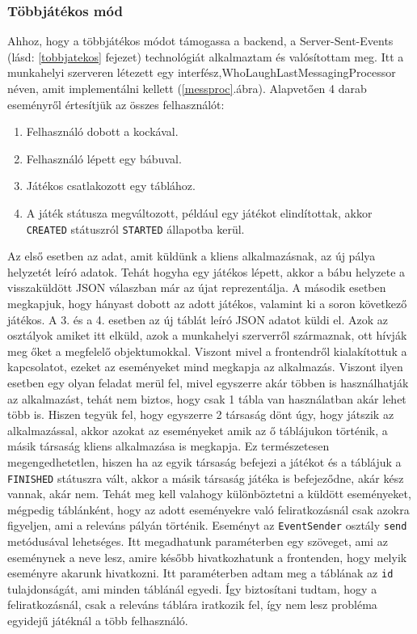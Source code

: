 \documentclass[a4paper,twoside]{article}
\begin{document}
\subsubsection{Többjátékos mód} \label{tobbjatekos-backend}
Ahhoz, hogy a többjátékos módot támogassa a backend, a Server-Sent-Events (lásd: \ref{tobbjatekos} fejezet) technológiát alkalmaztam és valósítottam meg. Itt a munkahelyi szerveren létezett  egy interfész,WhoLaughLastMessagingProcessor néven, amit implementálni kellett (\ref{messproc}.ábra). Alapvetően 4 darab eseményről értesítjük az összes felhasználót: \begin{enumerate}
	\item Felhasználó dobott a kockával.
	\item Felhasználó lépett egy bábuval.
	\item Játékos csatlakozott egy táblához.
	\item A játék státusza megváltozott, például egy játékot elindítottak, akkor \texttt{CRE\-ATED} státuszról \verb|STARTED| állapotba kerül.
\end{enumerate}
Az első esetben az adat, amit küldünk a kliens alkalmazásnak, az új pálya helyzetét leíró adatok. Tehát hogyha egy játékos lépett, akkor a bábu helyzete a visszaküldött JSON válaszban már az újat reprezentálja. A második esetben megkapjuk, hogy hányast dobott az adott játékos, valamint ki a soron következő játékos. A 3. és a 4. esetben az új táblát leíró JSON adatot küldi el. Azok az osztályok amiket itt elküld, azok a munkahelyi szerverről származnak, ott hívják meg őket a megfelelő objektumokkal. Viszont mivel a frontendről kialakítottuk a kapcsolatot, ezeket az eseményeket mind megkapja az alkalmazás. Viszont ilyen esetben egy olyan feladat merül fel, mivel egyszerre akár többen is használhatják az alkalmazást, tehát nem biztos, hogy csak 1 tábla van használatban akár lehet több is. Hiszen tegyük fel, hogy egyszerre 2 társaság dönt úgy, hogy játszik az alkalmazással, akkor azokat az eseményeket amik az ő táblájukon történik, a másik társaság kliens alkalmazása is megkapja. Ez természetesen megengedhetetlen, hiszen ha az egyik társaság befejezi a játékot és a táblájuk a \verb|FINISHED| státuszra vált, akkor a másik társaság játéka is befejeződne, akár kész vannak, akár nem. Tehát meg kell valahogy különböztetni a küldött eseményeket, mégpedig táblánként, hogy az adott eseményekre való feliratkozásnál csak azokra figyeljen, ami a releváns pályán történik. Eseményt az \verb|EventSender| osztály \verb|send| metódusával lehetséges. Itt megadhatunk paraméterben egy szöveget, ami az eseménynek a neve lesz, amire később hivatkozhatunk a frontenden, hogy melyik eseményre akarunk hivatkozni. Itt paraméterben adtam meg a táblának az \verb|id| tulajdonságát, ami minden táblánál egyedi. Így biztosítani tudtam, hogy a feliratkozásnál, csak a releváns táblára iratkozik fel, így nem lesz probléma egyidejű játéknál a több felhasználó. 
\end{document}
